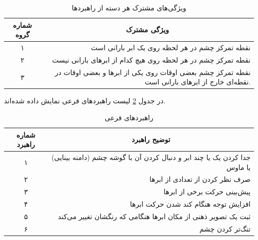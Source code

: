 \documentclass[twoside, a4paper,11pt]{book}
\numberwithin{equation}{chapter}
\numberwithin{table}{chapter}
\numberwithin{figure}{chapter}
\numberwithin{equation}{chapter}
\begin{document}
\begin{table}[]
\centering
\caption{ویژگی‌های مشترک هر دسته از راهبرد‌ها}
\label{mainStrategyGroups}
\begin{scriptsize}
\begin{center}
\renewcommand{\arraystretch}{2}
\begin{tabular}{|c|r|}
\hline
\textbf{شماره گروه} & \multicolumn{1}{c|}{\textbf{ویژگی مشترک}} \\ \hline
۱ & نقطه تمرکز چشم در هر لحظه روی یک ابر بارانی است \\ \hline
۲ & نقطه تمرکز چشم در هر لحظه روی هیچ کدام از ابرهای بارانی نیست \\ \hline
۳ & نقطه تمرکز چشم بعضی اوقات روی یکی از ابرها و بعضی اوقات در نقطه‌ای خارج از ابرهای بارانی است. \\ \hline
\end{tabular}
\end{center}
\end{scriptsize}
\end{table}
در جدول \ref{secondaryStrategies} لیست راهبرد‌های فرعی نمایش داده شده‌اند.

\begin{table}[]
\centering
\caption{راهبرد‌های فرعی}
\label{secondaryStrategies}
\begin{scriptsize}
\begin{center}
\renewcommand{\arraystretch}{2}
\begin{tabular}{|c|r|}
\hline
\textbf{شماره راهبرد} & \multicolumn{1}{c|}{\textbf{توضیح راهبرد}} \\ \hline
۱ & جدا کردن یک یا چند ابر و دنبال کردن آن با گوشه چشم (دامنه بینایی) یا ماوس \\ \hline
۲ & صرف نظر کردن از تعدادی از ابرها \\ \hline
۳ & پیش‌بینی حرکت برخی از ابرها \\ \hline
۴ & افزایش توجه هنگام کند شدن حرکت ابرها \\ \hline
۵ & ثبت یک تصویر ذهنی از مکان ابرها هنگامی که رنگشان تغییر می‌کند \\ \hline
۶ & تنگ‌تر کردن چشم \\ \hline
\end{tabular}
\end{center}
\end{scriptsize}
\end{table}
\end{document}
